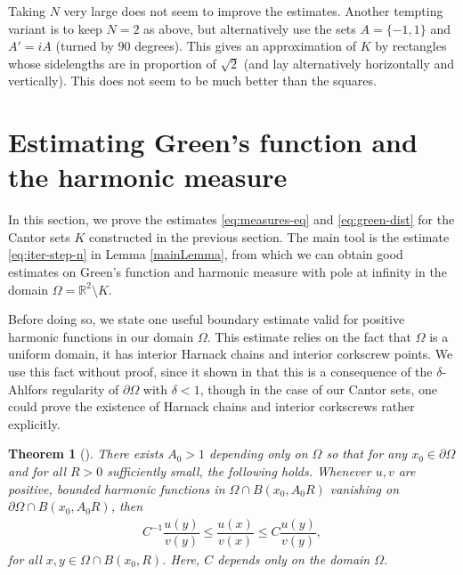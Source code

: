 \documentclass[10pt]{amsart}
\let\sm\setminus
\numberwithin{equation}{section}
\theoremstyle{plain}
\newtheorem{thm}[lem]{Theorem}
\theoremstyle{definition}
\newcommand{\R}{\mathbb{R}}
\begin{document}
Taking $N$ very large does not seem to improve the estimates.
Another tempting variant is to keep $N=2$ as above, but alternatively use the sets $A = \{ -1, 1 \}$
and $A' = i A$ (turned by $90$ degrees). This gives an approximation of $K$ by rectangles whose
sidelengths are in proportion of $\sqrt 2$ (and lay alternatively horizontally and vertically).
This does not seem to be much better than the squares.

\section[Green's function and the harmonic measure]{Estimating Green's function and the harmonic measure}
\label{sec:Green}

In this section, we prove the estimates \eqref{eq:measures-eq} and \eqref{eq:green-dist} for the Cantor sets $K$
constructed in the previous section. The main tool is the estimate \eqref{eq:iter-step-n} in Lemma \ref{mainLemma},
from which we can obtain good estimates on Green's function and harmonic measure with pole at infinity
in the domain $\Omega=\R^2\sm K$.

Before doing so, we state one useful boundary estimate valid for positive harmonic functions in our domain $\Omega$. This estimate relies on the fact that $\Omega$ is a uniform domain, \ie it has interior Harnack chains and interior corkscrew points. We use this fact without proof, since it shown in \cite[Lem.\,2.2]{DFM-Memoirs} that this is a consequence of the $\delta$-Ahlfors regularity of $\partial \Omega$ with $\delta < 1$, though in the case of our Cantor sets, one could prove the existence of Harnack chains and interior corkscrews rather explicitly.

\begin{thm}[{\cite[Th.\,1]{Aikawa01}}] \label{thm:bdry_harnack}
There exists $A_0 >1$ depending only on $\Omega$ so that for any $x_0 \in \partial \Omega$ and for all $R >0$ sufficiently small, the following holds. Whenever $u, v$ are positive, bounded harmonic functions in $\Omega \cap B(x_0, A_0 R)$ vanishing on $\partial \Omega \cap B(x_0, A_0R)$, then
\begin{align*}
C^{-1} \dfrac{u(y)}{v(y) } \le \dfrac{u(x)}{v(x)} \le C \dfrac{u(y)}{v(y)},
\end{align*}
for all $x,y \in \Omega \cap B(x_0, R)$. Here, $C$ depends only on the domain $\Omega$.
\end{thm}
\end{document}

